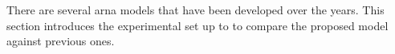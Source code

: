 
There are several \gls{arna} models that have been
developed over the years. This section introduces the
experimental set up to to compare the proposed model against
previous ones.
